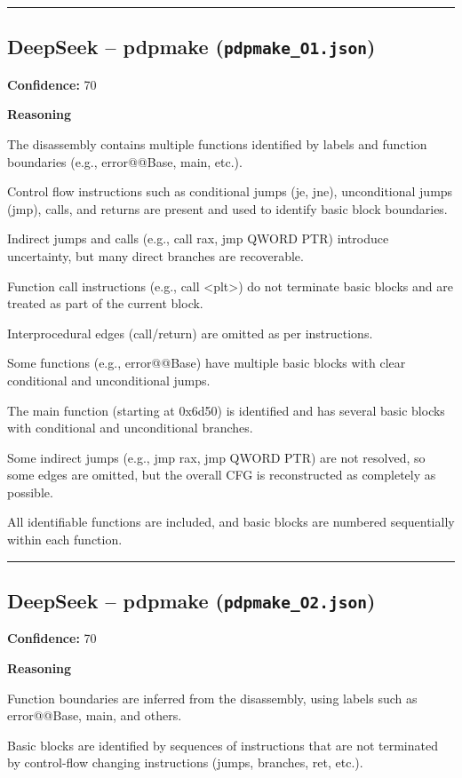 \bigskip
\hrule
\bigskip

\subsection{DeepSeek -- pdpmake (\texttt{pdpmake\_O1.json})}

\textbf{Confidence:} 70

\textbf{Reasoning}

The disassembly contains multiple functions identified by labels and function boundaries (e.g., error@@Base, main, etc.).

Control flow instructions such as conditional jumps (je, jne), unconditional jumps (jmp), calls, and returns are present and used to identify basic block boundaries.

Indirect jumps and calls (e.g., call rax, jmp QWORD PTR) introduce uncertainty, but many direct branches are recoverable.

Function call instructions (e.g., call <plt>) do not terminate basic blocks and are treated as part of the current block.

Interprocedural edges (call/return) are omitted as per instructions.

Some functions (e.g., error@@Base) have multiple basic blocks with clear conditional and unconditional jumps.

The main function (starting at 0x6d50) is identified and has several basic blocks with conditional and unconditional branches.

Some indirect jumps (e.g., jmp rax, jmp QWORD PTR) are not resolved, so some edges are omitted, but the overall CFG is reconstructed as completely as possible.

All identifiable functions are included, and basic blocks are numbered sequentially within each function.

\bigskip
\hrule
\bigskip

\subsection{DeepSeek -- pdpmake (\texttt{pdpmake\_O2.json})}

\textbf{Confidence:} 70

\textbf{Reasoning}

Function boundaries are inferred from the disassembly, using labels such as error@@Base, main, and others.

Basic blocks are identified by sequences of instructions that are not terminated by control-flow changing instructions (jumps, branches, ret, etc.).

